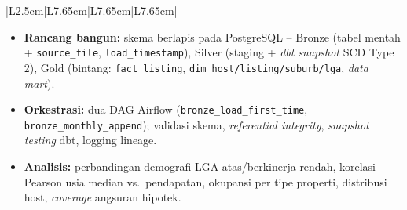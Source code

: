 \documentclass[11pt,a4paper]{article}
\newenvironment{cellitems}
  {\vspace{-2pt}\begin{itemize}\setlength{\itemsep}{1.5pt}\setlength{\parskip}{0pt}\setlength{\topsep}{1pt}}
  {\end{itemize}\vspace{-2pt}}
\begin{document}
\begin{longtable}{|L{2.5cm}|L{7.65cm}|L{7.65cm}|L{7.65cm}|}
\begin{cellitems}
  \item \textbf{Rancang bangun:} skema berlapis pada PostgreSQL -- Bronze (tabel mentah + \texttt{source\_file}, \texttt{load\_timestamp}), Silver (staging + \textit{dbt snapshot} SCD Type 2), Gold (bintang: \texttt{fact\_listing}, \texttt{dim\_host/listing/suburb/lga}, \textit{data mart}).
  \item \textbf{Orkestrasi:} dua DAG Airflow (\texttt{bronze\_load\_first\_time}, \texttt{bronze\_monthly\_append}); validasi skema, \textit{referential integrity}, \textit{snapshot testing} dbt, logging lineage.
  \item \textbf{Analisis:} perbandingan demografi LGA atas/berkinerja rendah, korelasi Pearson usia median vs.\ pendapatan, okupansi per tipe properti, distribusi host, \textit{coverage} angsuran hipotek.
\end{cellitems} \\
\hline


\end{longtable}
\end{document}
